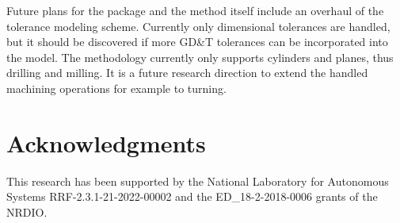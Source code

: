 \documentclass{juliacon}
\begin{document}
Future plans for the package and the method itself include an overhaul of the tolerance modeling scheme.
Currently only dimensional tolerances are handled, but it should be discovered if more GD\&T tolerances can be incorporated into the model.
The methodology currently only supports cylinders and planes, thus drilling and milling.
It is a future research direction to extend the handled machining operations for example to turning.



\section{Acknowledgments}
This research has been supported by the National Laboratory for Autonomous Systems RRF-2.3.1-21-2022-00002 and the ED\_18-2-2018-0006 grants of the NRDIO.


\end{document}
